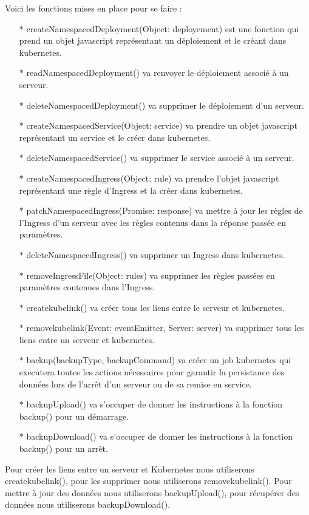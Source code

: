 \documentclass{article}
\begin{document}
\newline
Voici les fonctions mises en place pour se faire :
\begin{itemize}
	\item[$\ast$]createNamespacedDeployment(Object: deployement) est une fonction qui prend un objet javascript représentant un déploiement et le créant dans kubernetes.
	\item[$\ast$]readNamespacedDeployment() va renvoyer le déploiement associé à un serveur.
	\item[$\ast$]deleteNamespacedDeployment() va supprimer le déploiement d'un serveur.
	\item[$\ast$]createNamespacedService(Object: service) va prendre un objet javascript représentant un service et le créer dans kubernetes.
	\item[$\ast$]deleteNamespacedService() va supprimer le service associé à un serveur.
	\item[$\ast$]createNamespacedIngress(Object: rule) va prendre l'objet javascript représentant une règle d'Ingress et la créer dans kubernetes.
	\item[$\ast$]patchNamespacedIngress(Promise: response) va mettre à jour les règles de l'Ingress d'un serveur avec les règles contenus dans la réponse passée en paramètres.
	\item[$\ast$]deleteNamespacedIngress() va supprimer un Ingress dans kubernetes.
	\item[$\ast$]removeIngressFile(Object: rules) va supprimer les règles passées en paramètres contenues dans l'Ingress.
	\item[$\ast$]createkubelink() va créer tous les liens entre le serveur et kubernetes.
	\item[$\ast$]removekubelink(Event: eventEmitter, Server: server) va supprimer tous les liens entre un serveur et kubernetes.
	\item[$\ast$]backup(backupType, backupCommand) va créer un job kubernetes qui executera toutes les actions nécessaires pour garantir la persistance des données lors de l'arrêt d'un serveur ou de sa remise en service.
	\item[$\ast$]backupUpload() va s'occuper de donner les instructions à la fonction backup() pour un démarrage.
	\item[$\ast$]backupDownload() va s'occuper de donner les instructions à la fonction backup() pour un arrêt.
\end{itemize}
Pour créer les liens entre un serveur et Kubernetes nous utiliserons createkubelink(), pour les supprimer nous utiliserons removekubelink(). Pour mettre à jour des données nous utiliserons backupUpload(), pour récupérer des données nous utiliserons backupDownload().
\end{document}
